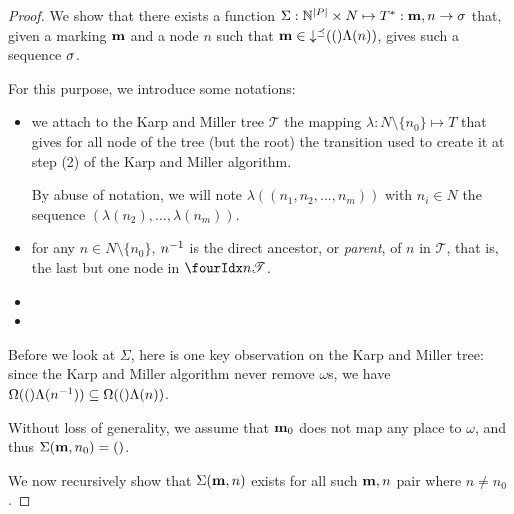 \begin{proof}
  We show that there exists a function $\Sigma : \naturals^{\card{\places}} \times N \mapsto T^* : \mar, n \rightarrow \seqt$ that, given a marking $\mathbf{m}$ and a node $n$ such that $\mathbf{m} \in \operatorname{\downarrow^\preceq}(()\Lambda(n))$, gives such a sequence $\seqt$.

  For this purpose, we introduce some notations:
  \begin{itemize}
    \item we attach to the Karp and Miller tree $\mathcal{T}$ the mapping $\lambda : N \setminus \{n_0\} \mapsto T$ that gives for all node of the tree (but the root) the transition used to create it at step (2) of the Karp and Miller algorithm.

      By abuse of notation, we will note $\lambda((n_1, n_2, ..., n_m))$
      with  $n_i \in N$
      the sequence $(\lambda(n_2), ..., \lambda(n_m))$.
    \item for any $n \in N \setminus \{n_0\}$, $n^{-1}$ is the direct ancestor, or \emph{parent}, of $n$ in $\mathcal{T}$, that is, the last but one node in $\treepath{n}$.
    \item {}
    \item {}
  \end{itemize}

  Before we look at $\Sigma$, here is one key observation on the Karp and Miller tree:
  since the Karp and Miller algorithm never remove $\omega$s, we have
  $\operatorname{\Omega}(()\Lambda(n^{-1})) \subseteq \operatorname{\Omega}(()\Lambda(n))$.

  Without loss of generality, we assume that $\mathbf{m}_0$ does not map any place to $\omega$, and thus $\Sigma(\mathbf{m}, n_0) = ()$.

  We now recursively show that $\Sigma(\mathbf{m}, n)$ exists for all such $\mathbf{m}, n$ pair where $n \neq n_0$.


\end{proof}
